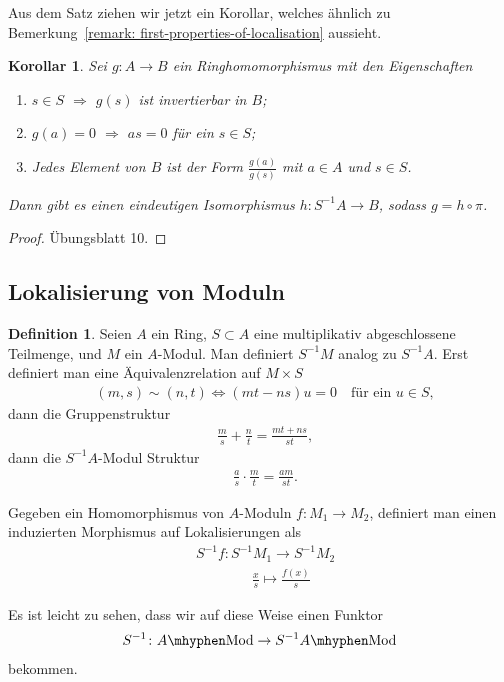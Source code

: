\documentclass[reqno,12pt]{article}
\numberwithin{equation}{section}
\theoremstyle{plain}
\newtheorem{cor}[thm]{Korollar}
\theoremstyle{definition}
\newtheorem{definition}[thm]{Definition}
\newcommand{\Mod}{\text{Mod}}
\begin{document}
Aus dem Satz ziehen wir jetzt ein Korollar, welches ähnlich zu Bemerkung~\ref{remark: first-properties-of-localisation} aussieht.
\begin{cor}
Sei $g \colon A \to B$ ein Ringhomomorphismus mit den Eigenschaften
\begin{enumerate}
\item $s \in S$ $\Rightarrow$ $g(s)$ ist invertierbar in $B$;
\item $g(a)=0$ $\Rightarrow$ $as = 0$ für ein $s \in S$;
\item Jedes Element von $B$ ist der Form $\frac{g(a)}{g(s)}$ mit $a \in A$ und $s \in S$.
\end{enumerate}
Dann gibt es einen eindeutigen Isomorphismus $h \colon S^{-1}A \to B$, sodass $g = h \circ \pi$.
\end{cor}

\begin{proof}
Übungsblatt 10.
\end{proof}

\subsection{Lokalisierung von Moduln}

\begin{definition}
Seien $A$ ein Ring, $S \subset A$ eine multiplikativ abgeschlossene Teilmenge, und $M$ ein $A$-Modul. Man definiert $S^{-1}M$ analog zu $S^{-1}A$. Erst definiert man eine Äquivalenzrelation auf $M \times S$
\begin{align*}
& (m,s) \sim (n,t) \iff (mt-ns)u = 0 \quad \text{für ein }  u \in S,
\end{align*}
dann die Gruppenstruktur
\begin{align*}
& \frac{m}{s} + \frac{n}{t} = \frac{mt + ns}{st},
\end{align*}
dann die $S^{-1}A$-Modul Struktur
\begin{align*}
& \frac{a}{s} \cdot \frac{m}{t} = \frac{am}{st}.
\end{align*}

Gegeben ein Homomorphismus von $A$-Moduln $f \colon M_1 \to M_2$, definiert man einen induzierten Morphismus auf Lokalisierungen als
\begin{align*}
& S^{-1}f \colon S^{-1}M_1 \to S^{-1}M_2 \\
& \qquad \qquad \frac{x}{s} \mapsto \frac{f(x)}{s}
\end{align*}

Es ist leicht zu sehen, dass wir auf diese Weise einen Funktor
\begin{align*}
S^{-1}  \colon A \mhyphen \Mod \to S^{-1}A \mhyphen \Mod
\end{align*}
bekommen.
\end{definition}
\end{document}
